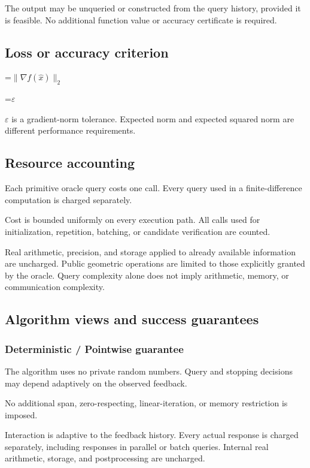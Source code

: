 \documentclass[10pt,a4paper]{article}
\newcommand{\AtlasMath}[1]{\par\begingroup\centering\setbox0=\hbox{$\displaystyle #1$}\ifdim\wd0>1.4\linewidth\typeout{ATLAS WIDE FORMULA: \the\wd0}\fi\ifdim\wd0>\linewidth\resizebox{\linewidth}{!}{\box0}\else\box0\fi\par\endgroup}
\newcommand{\AtlasInlineMath}[1]{\begingroup\setbox0=\hbox{$#1$}\ifdim\wd0>.4\linewidth\endgroup\AtlasMath{#1}\else\endgroup$#1$\fi}
\begin{document}
The output may be unqueried or constructed from the query history, provided it is feasible. No additional function value or accuracy certificate is required.

\subsection{Loss or accuracy criterion}

\AtlasMath{\|\nabla f(\widehat{x})\|_2}


\AtlasInlineMath{\varepsilon} is a gradient-norm tolerance. Expected norm and expected squared norm are different performance requirements.

\subsection{Resource accounting}
Each primitive oracle query costs one call. Every query used in a finite-difference computation is charged separately.

Cost is bounded uniformly on every execution path. All calls used for initialization, repetition, batching, or candidate verification are counted.

Real arithmetic, precision, and storage applied to already available information are uncharged. Public geometric operations are limited to those explicitly granted by the oracle. Query complexity alone does not imply arithmetic, memory, or communication complexity.

\subsection{Algorithm views and success guarantees}
\subsubsection{Deterministic / Pointwise guarantee}
The algorithm uses no private random numbers. Query and stopping decisions may depend adaptively on the observed feedback.

No additional span, zero-respecting, linear-iteration, or memory restriction is imposed.

Interaction is adaptive to the feedback history. Every actual response is charged separately, including responses in parallel or batch queries. Internal real arithmetic, storage, and postprocessing are uncharged.
\end{document}
